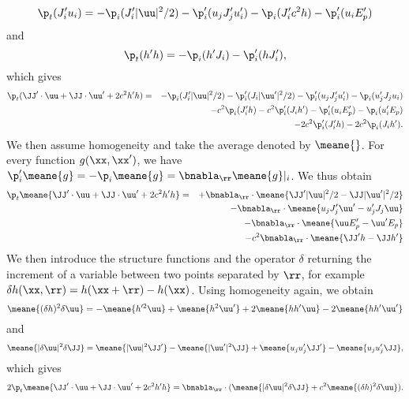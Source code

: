 \begin{equation}
\p_t ( J_i' u_i ) = - \p_i( J_i'|\uu|^2/2) - \p_i'(u_j J_j' u_i')
-\p_i (J_i' c^2 h)  - \p_i' (u_i E_p')
\end{equation}
and
\begin{equation}
\p_t ( h' h ) = - \p_i( h'J_i ) - \p_i'( hJ_i' ),
\end{equation}
which gives
\begin{eqnarray}
\p_t ( \JJ'\cdot\uu + \JJ\cdot\uu' + 2c^2 h'h )
&=& - \p_i( J_i'|\uu|^2/2) - \p_i'( J_i|\uu'|^2/2) %
- \p_i'(u_j J_j' u_i') - \p_i(u_j' J_j u_i) \nonumber\\
&& -c^2\p_i (J_i'h) - c^2\p_i' (J_ih') %
- \p_i' (u_i E_p') - \p_i (u_i' E_p) \nonumber\\
&& -2c^2\p_i' (J_i'h) - 2c^2\p_i (J_ih').
\end{eqnarray}
We then assume homogeneity and take the average denoted by
$\meane{}$.   For
every function $g(\xx, \xx')$, we have $\p_i' \meane{g} =
-\p_i\meane{g} = \bnabla_{\rr} \meane{g}|_i$. We thus obtain
\begin{eqnarray}
\p_t \meane{ \JJ'\cdot\uu + \JJ\cdot\uu' + 2c^2 h'h }
&=& + \bnabla_{\rr}\cdot\meane{ \JJ'|\uu|^2/2 - \JJ|\uu'|^2/2 } \nonumber\\
&& - \bnabla_{\rr}\cdot\meane{ u_j J_j' \uu' - u_j' J_j \uu } \nonumber\\
&& - \bnabla_{\rr}\cdot\meane{ \uu E_p'- \uu' E_p } \nonumber\\
&& -c^2\bnabla_{\rr}\cdot\meane{ \JJ'h - \JJ h' }
\end{eqnarray}
%
We then introduce the structure functions and the operator $\delta$
returning the increment of a variable between two points separated by $\rr$, 
for example $\delta h (\xx, \rr) = h(\xx+\rr)- h(\xx)$.
%
Using homogeneity again, we obtain
\begin{equation}
\meane{ (\delta h)^2 \delta\uu } = 
-\meane{ h'^2 \uu } + \meane{ h^2 \uu' }
+2\meane{ hh' \uu } - 2\meane{ hh' \uu' }
\end{equation}
and 
\begin{equation}
\meane{ |\delta \uu|^2 \delta\JJ } = 
\meane{  |\uu|^2 \JJ' } - \meane{ |\uu'|^2\JJ }
+\meane{ u_ju_j' \JJ' } - \meane{  u_ju_j' \JJ },
\end{equation}
which gives
\begin{equation} \label{FluxT}
2\p_t \meane{ \JJ'\cdot\uu + \JJ\cdot\uu' + 2c^2 h'h }
= \bnabla_{\rr} \cdot ( \meane{ |\delta \uu|^2 \delta\JJ } 
+ c^2\meane{ (\delta h)^2 \delta\uu } ).
\end{equation}

